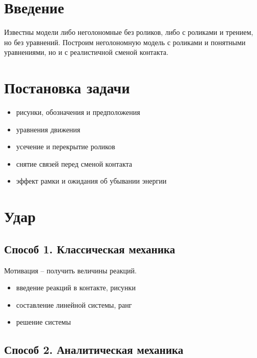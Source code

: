 \section{Введение}

Известны модели либо неголономные без роликов, либо с роликами и трением, но без уравнений.
Построим неголономную модель с роликами и понятными уравнениями, но и с реалистичной сменой контакта.

\section{Постановка задачи}

\begin{itemize}
    \item рисунки, обозначения и предположения
    \item уравнения движения
    \item усечение и перекрытие роликов
    \item снятие связей перед сменой контакта
    \item эффект рамки и ожидания об убывании энергии
\end{itemize}

\section{Удар}

\subsection{Способ 1. Классическая механика}

Мотивация -- получить величины реакций.

\begin{itemize}
    \item введение реакций в контакте, рисунки
    \item составление линейной системы, ранг
    \item решение системы
\end{itemize}

\subsection{Способ 2. Аналитическая механика}

